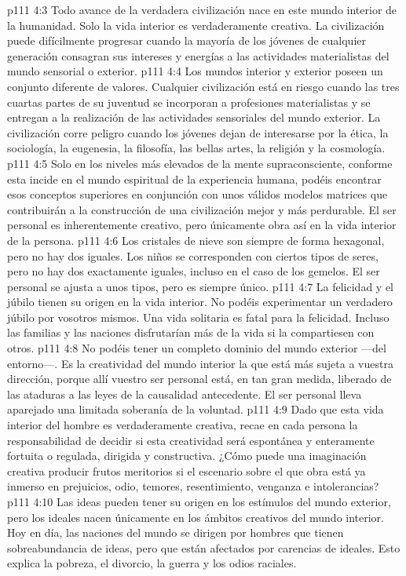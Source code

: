 \vs p111 4:3 \pc Todo avance de la verdadera civilización nace en este mundo interior de la humanidad. Solo la vida interior es verdaderamente creativa. La civilización puede difícilmente progresar cuando la mayoría de los jóvenes de cualquier generación consagran sus intereses y energías a las actividades materialistas del mundo sensorial o exterior.
\vs p111 4:4 Los mundos interior y exterior poseen un conjunto diferente de valores. Cualquier civilización está en riesgo cuando las tres cuartas partes de su juventud se incorporan a profesiones materialistas y se entregan a la realización de las actividades sensoriales del mundo exterior. La civilización corre peligro cuando los jóvenes dejan de interesarse por la ética, la sociología, la eugenesia, la filosofía, las bellas artes, la religión y la cosmología.
\vs p111 4:5 Solo en los niveles más elevados de la mente supraconsciente, conforme esta incide en el mundo espiritual de la experiencia humana, podéis encontrar esos conceptos superiores en conjunción con unos válidos modelos matrices que contribuirán a la construcción de una civilización mejor y más perdurable. El ser personal es inherentemente creativo, pero únicamente obra así en la vida interior de la persona.
\vs p111 4:6 \pc Los cristales de nieve son siempre de forma hexagonal, pero no hay dos iguales. Los niños se corresponden con ciertos tipos de seres, pero no hay dos exactamente iguales, incluso en el caso de los gemelos. El ser personal se ajusta a unos tipos, pero es siempre único.
\vs p111 4:7 \pc La felicidad y el júbilo tienen su origen en la vida interior. No podéis experimentar un verdadero júbilo por vosotros mismos. Una vida solitaria es fatal para la felicidad. Incluso las familias y las naciones disfrutarían más de la vida si la compartiesen con otros.
\vs p111 4:8 \pc No podéis tener un completo dominio del mundo exterior ---del entorno---. Es la creatividad del mundo interior la que está más sujeta a vuestra dirección, porque allí vuestro ser personal está, en tan gran medida, liberado de las ataduras a las leyes de la causalidad antecedente. El ser personal lleva aparejado una limitada soberanía de la voluntad.
\vs p111 4:9 Dado que esta vida interior del hombre es verdaderamente creativa, recae en cada persona la responsabilidad de decidir si esta creatividad será espontánea y enteramente fortuita o regulada, dirigida y constructiva. ¿Cómo puede una imaginación creativa producir frutos meritorios si el escenario sobre el que obra está ya inmerso en prejuicios, odio, temores, resentimiento, venganza e intolerancias?
\vs p111 4:10 Las ideas pueden tener su origen en los estímulos del mundo exterior, pero los ideales nacen únicamente en los ámbitos creativos del mundo interior. Hoy en día, las naciones del mundo se dirigen por hombres que tienen sobreabundancia de ideas, pero que están afectados por carencias de ideales. Esto explica la pobreza, el divorcio, la guerra y los odios raciales.
